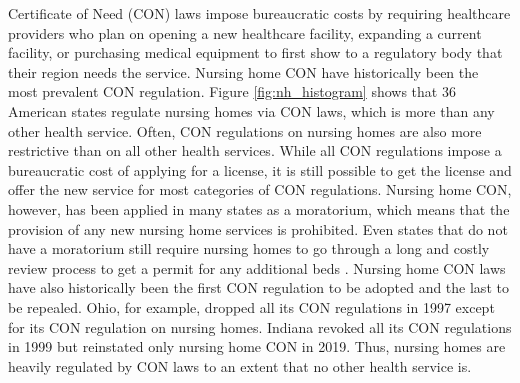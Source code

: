 \documentclass[../Main.tex]{subfiles}
\begin{document}
Certificate of Need (CON) laws impose bureaucratic costs by requiring healthcare providers who plan on opening a new healthcare facility, expanding a current facility, or purchasing medical equipment to first show to a regulatory body that their region needs the service. Nursing home CON have historically been the most prevalent CON regulation. Figure \ref{fig:nh_histogram} shows that 36 American states regulate nursing homes via CON laws, which is more than any other health service. Often, CON regulations on nursing homes are also more restrictive than on all other health services. While all CON regulations impose a bureaucratic cost of applying for a license, it is still possible to get the license and offer the new service for most categories of CON regulations. Nursing home CON, however, has been applied in many states as a moratorium, which means that the provision of any new nursing home services is prohibited. Even states that do not have a moratorium still require nursing homes to go through a long and costly review process to get a permit for any additional beds \citep{american2020american}. Nursing home CON laws have also historically been the first CON regulation to be adopted and the last to be repealed. Ohio, for example, dropped all its CON regulations in 1997 except for its CON regulation on nursing homes. Indiana revoked all its CON regulations in 1999 but reinstated only nursing home CON in 2019. Thus, nursing homes are heavily regulated by CON laws to an extent that no other health service is. 
 
\end{document}
